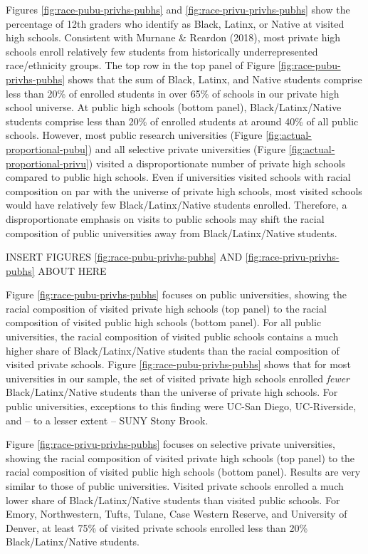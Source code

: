 \documentclass[
  12pt,
]{article}
\begin{document}
Figures \ref{fig:race-pubu-privhs-pubhs} and \ref{fig:race-privu-privhs-pubhs} show the percentage of 12th graders who identify as Black, Latinx, or Native at visited high schools. Consistent with Murnane \& Reardon (2018), most private high schools enroll relatively few students from historically underrepresented race/ethnicity groups. The top row in the top panel of Figure \ref{fig:race-pubu-privhs-pubhs} shows that the sum of Black, Latinx, and Native students comprise less than 20\% of enrolled students in over 65\% of schools in our private high school universe. At public high schools (bottom panel), Black/Latinx/Native students comprise less than 20\% of enrolled students at around 40\% of all public schools. However, most public research universities (Figure \ref{fig:actual-proportional-pubu}) and all selective private universities (Figure \ref{fig:actual-proportional-privu}) visited a disproportionate number of private high schools compared to public high schools. Even if universities visited schools with racial composition on par with the universe of private high schools, most visited schools would have relatively few Black/Latinx/Native students enrolled. Therefore, a disproportionate emphasis on visits to public schools may shift the racial composition of public universities away from Black/Latinx/Native students.

INSERT FIGURES \ref{fig:race-pubu-privhs-pubhs} AND \ref{fig:race-privu-privhs-pubhs} ABOUT HERE

Figure \ref{fig:race-pubu-privhs-pubhs} focuses on public universities, showing the racial composition of visited private high schools (top panel) to the racial composition of visited public high schools (bottom panel). For all public universities, the racial composition of visited public schools contains a much higher share of Black/Latinx/Native students than the racial composition of visited private schools. Figure \ref{fig:race-pubu-privhs-pubhs} shows that for most universities in our sample, the set of visited private high schools enrolled \emph{fewer} Black/Latinx/Native students than the universe of private high schools. For public universities, exceptions to this finding were UC-San Diego, UC-Riverside, and -- to a lesser extent -- SUNY Stony Brook.

Figure \ref{fig:race-privu-privhs-pubhs} focuses on selective private universities, showing the racial composition of visited private high schools (top panel) to the racial composition of visited public high schools (bottom panel). Results are very similar to those of public universities. Visited private schools enrolled a much lower share of Black/Latinx/Native students than visited public schools. For Emory, Northwestern, Tufts, Tulane, Case Western Reserve, and University of Denver, at least 75\% of visited private schools enrolled less than 20\% Black/Latinx/Native students.
\end{document}

